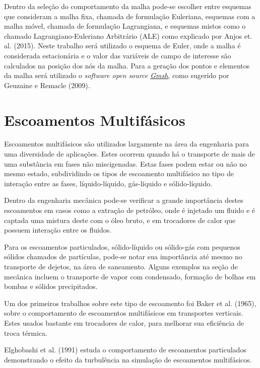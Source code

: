 Dentro da seleção do comportamento da malha pode-se escolher entre esquemas que consideram a malha fixa, chamada de formulação Euleriana, esquemas com a malha móvel, chamada de formulação Lagrangiana, e esquemas mistos como o chamado Lagrangiano-Euleriano Arbitrário (ALE) como explicado por Anjos et. al. (2015)\cite{ALE-2015}.
Neste trabalho será utilizado o esquema de Euler, onde a malha é considerada estacionária e o valor das variáveis de campo de interesse são calculados na posição dos nós da malha.
Para a geração dos pontos e elementos da malha será utilizado o \textit{software open source \href{http://gmsh.info}{Gmsh}}, como sugerido por Geuzaine e Remacle (2009)\cite{gmsh}.

\section{\textbf{Escoamentos Multifásicos}}
\label{sec_rev_MF}
Escoamentos multifásicos são utilizados largamente na área da engenharia para uma diversidade de aplicações.
Estes ocorrem quando há o transporte de mais de uma substância em fases não miscigenadas.
Estas fases podem estar ou não no mesmo estado, subdividindo os tipos de escoamento multifásico no tipo de interação entre as fases, líquido-líquido, gás-líquido e sólido-líquido.

Dentro da engenharia mecânica pode-se verificar a grande importância destes escoamentos em casos como a extração de petróleo, onde é injetado um fluido e é captada uma mistura deste com o óleo bruto, e em trocadores de calor que possuem interação entre os fluidos.

Para os escoamentos particulados, sólido-líquido ou sólido-gás com pequenos sólidos chamados de partículas, pode-se notar sua importância até mesmo no transporte de dejetos, na área de saneamento.%
Alguns exemplos na seção de mecânica incluem o transporte de vapor com condensado, formação de bolhas em bombas e sólidos precipitados.

Um dos primeiros trabalhos sobre este tipo de escoamento foi Baker et al. (1965)\cite{Baker-1965}, sobre o comportamento de escoamentos multifásicos em transportes verticais.
Estes usados bastante em trocadores de calor, para melhorar sua eficiência de troca térmica.

Elghobashi et al. (1991)\cite{Elghobashi-1991} estuda o comportamento de escoamentos particulados demonstrando o efeito da turbulência na simulação de escoamentos multifásicos.

